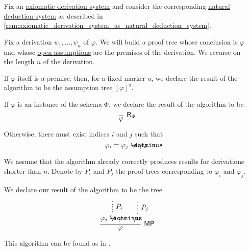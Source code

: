 \begin{algorithm}\label{alg:axiomatic_derivation_to_proof_tree}
  Fix an \hyperref[def:axiomatic_derivation_system]{axiomatic derivation system} and consider the corresponding \hyperref[def:abstract_natural_deduction_system]{natural deduction system} as described in \cref{rem:axiomatic_derivation_system_as_natural_deduction_system}.

  Fix a derivation \( \psi_1, \ldots, \psi_n \) of \( \varphi \). We will build a proof tree whose conclusion is \( \varphi \) and whose \hyperref[def:propositional_natural_deduction_proof_tree/open]{open assumptions} are the premises of the derivation. We recurse on the length \( n \) of the derivation.

  \begin{thmenum}
     If \( \varphi \) itself is a premise, then, for a fixed marker \( u \), we declare the result of the algorithm to be the assumption tree \( [\varphi]^u \).

     If \( \varphi \) is an instance of the schema \( \Phi \), we declare the result of the algorithm to be
    \begin{equation*}
      \begin{prooftree}
        \infer0[\ensuremath{ \logic{R}_\Phi }]{ \varphi }
      \end{prooftree}
    \end{equation*}

     Otherwise, there must exist indices \( i \) and \( j \) such that
    \begin{equation*}
      \varphi_i = \varphi_j \synimplies \varphi_n.
    \end{equation*}

    We assume that the algorithm already correctly produces results for derivations shorter than \( n \). Denote by \( P_i \) and \( P_j \) the proof trees corresponding to \( \varphi_i \) and \( \varphi_j \).

    We declare our result of the algorithm to be the tree
    \begin{equation*}
      \begin{prooftree}
        \hypo{}
        \ellipsis { \( P_i \) } { \varphi_j \synimplies \varphi }

        \hypo{}
        \ellipsis { \( P_j \) } { \varphi_j }

        \infer2[\logic{MP}]{ \varphi }
      \end{prooftree}
    \end{equation*}
  \end{thmenum}
\end{algorithm}
\begin{comments}
  \item This algorithm can be found as  in \cite{notebook:code}.
\end{comments}

